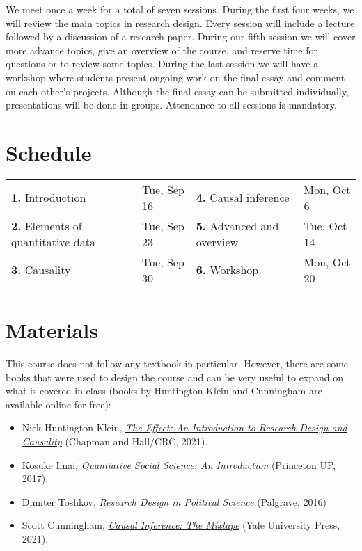 \documentclass[12pt, a4paper]{article}
\begin{document}
We meet once a week for a total of seven sessions. During the first four weeks, we will review the main topics in research design. Every session will include a lecture followed by a discussion of a research paper. During our fifth session we will cover more advance topics, give an overview of the course, and reserve time for questions or to review some topics. During the last session we will have a workshop where students present ongoing work on the final essay and comment on each other's projects. Although the final essay can be submitted individually, presentations will be done in groups. Attendance to all sessions is mandatory.

\section{Schedule}



\begin{tabular}{ll|ll}
\textbf{1.} Introduction & Tue, Sep 16 & \textbf{4.} Causal inference & Mon, Oct 6 \\
\textbf{2.} Elements of quantitative data & Tue, Sep 23 & \textbf{5.} Advanced and overview & Tue, Oct 14 \\
\textbf{3.} Causality & Tue, Sep 30 & \textbf{6.} Workshop& Mon, Oct 20 \\
\end{tabular}

\section{Materials}

This course does not follow any textbook in particular.
However, there are some books that were used to design the course and can be very useful to expand on what is covered in class (books by Huntington-Klein and Cunningham are available online for free):

\begin{itemize}
\setlength\itemsep{-5pt}
  \item Nick Huntington-Klein, \href{https://theeffectbook.net/}{\textit{The Effect: An Introduction to Research Design and Causality}} (Chapman and Hall/CRC, 2021).
  \item Kosuke Imai, \textit{Quantiative Social Science: An Introduction} (Princeton UP, 2017).
  \item Dimiter Toshkov, \textit{Research Design in Political Science} (Palgrave, 2016)
  \item Scott Cunningham, \href{https://mixtape.scunning.com/}{\textit{Causal Inference: The Mixtape}} (Yale University Press, 2021).
\end{itemize}
\end{document}
